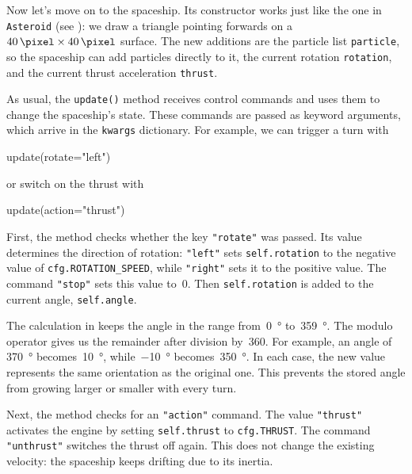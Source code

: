 Now let's move on to the spaceship. Its constructor works just like the one in \texttt{Asteroid} (see ): we draw a triangle pointing forwards on a $\SI{40}{\pixel} \times \SI{40}{\pixel}$ surface. The new additions are the particle list \texttt{particle}, so the spaceship can add particles directly to it, the current rotation \texttt{rotation}, and the current thrust acceleration \texttt{thrust}.


As usual, the \texttt{update()} method receives control commands and uses them to change the spaceship's state. These commands are passed as keyword arguments, which arrive in the \texttt{kwargs} dictionary. For example, we can trigger a turn with
\begin{codebox}
	update(rotate="left")
\end{codebox}
or switch on the thrust with
\begin{codebox}
	update(action="thrust")
\end{codebox}

First, the method checks whether the key \verb+"rotate"+ was passed. Its value determines the direction of rotation: \verb+"left"+ sets \texttt{self.rotation} to the negative value of \texttt{cfg.ROTATION\_SPEED}, while \verb+"right"+ sets it to the positive value. The command \verb+"stop"+ sets this value to~0. Then \texttt{self.rotation} is added to the current angle, \texttt{self.angle}.

The calculation in  keeps the angle in the range from~\SI{0}{\degree} to~\SI{359}{\degree}. The modulo operator gives us the remainder after division by~360. For example, an angle of \SI{370}{\degree} becomes~\SI{10}{\degree}, while~\SI{-10}{\degree} becomes~\SI{350}{\degree}. In each case, the new value represents the same orientation as the original one. This prevents the stored angle from growing larger or smaller with every turn.

Next, the method checks for an \verb+"action"+ command. The value \verb+"thrust"+ activates the engine by setting \texttt{self.thrust} to \texttt{cfg.THRUST}. The command \verb+"unthrust"+ switches the thrust off again. This does not change the existing velocity: the spaceship keeps drifting due to its inertia.


